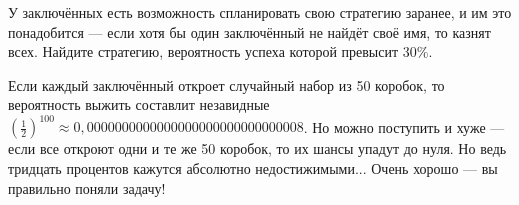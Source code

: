 У заключённых есть возможность спланировать свою стратегию заранее, и им это понадобится --- если хотя бы один заключённый не найдёт своё имя, то казнят всех.
Найдите стратегию, вероятность успеха которой превысит 30\%.

 Если каждый заключённый откроет случайный набор из 50 коробок, то вероятность выжить составлит незавидные $(\tfrac12)^{100}\approx 0{,}0000000000000000000000000000008$.
Но можно поступить и хуже --- если все откроют одни и те же 50 коробок, то их шансы упадут до нуля.
Но ведь тридцать процентов кажутся абсолютно недостижимыми...
Очень хорошо --- вы правильно поняли задачу!
